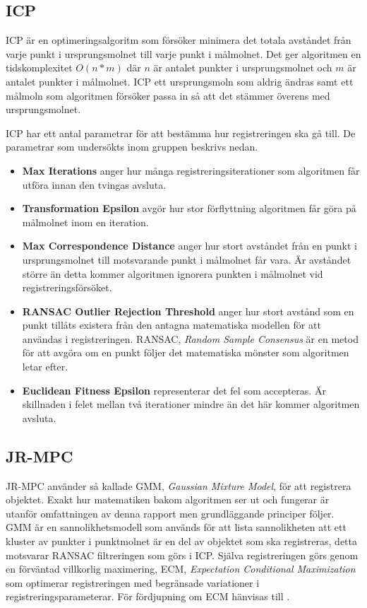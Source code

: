 \subsection{ICP}
ICP är en optimeringsalgoritm som försöker minimera det totala avståndet från varje punkt i ursprungsmolnet till varje punkt i målmolnet. Det ger algoritmen en tidskomplexitet $ \mathit{O(n*m)} $ där $ \mathit{n} $ är antalet punkter i ursprungsmolnet och $ \mathit{m} $ är antalet punkter i målmolnet. ICP ett ursprungsmoln som aldrig ändras samt ett målmoln som algoritmen försöker passa in så att det stämmer överens med ursprungsmolnet. 

ICP har ett antal parametrar för att bestämma hur registreringen ska gå till. De parametrar som undersökts inom gruppen beskrivs nedan.
\begin{itemize}
	\item \textbf{Max Iterations} anger hur många registrerings\-iterationer som algoritmen får utföra innan den tvingas avsluta.
	\item \textbf{Transformation Epsilon} avgör hur stor förflyttning algoritmen får göra på målmolnet inom en iteration.
	\item \textbf{Max Correspondence Distance} anger hur stort avståndet från en punkt i ursprungsmolnet till motsvarande punkt i målmolnet får vara. Är avståndet större än detta kommer algoritmen ignorera punkten i målmolnet vid registreringsförsöket.
	\item \textbf{RANSAC Outlier Rejection Threshold} anger hur stort avstånd som en punkt tillåts existera från den antagna matematiska modellen för att användas i registreringen. RANSAC, \textit{Random Sample Consensus} är en metod för att avgöra om en punkt följer det matematiska mönster som algoritmen letar efter.
	\item \textbf{Euclidean Fitness Epsilon} representerar det fel som accepteras. Är skillnaden i felet mellan två iterationer mindre än det här kommer algoritmen avsluta.
\end{itemize}

\subsection{JR-MPC}
JR-MPC använder så kallade GMM, \textit{Gaussian Mixture Model}, för att registrera objektet. Exakt hur matematiken bakom algoritmen ser ut och fungerar är utanför omfattningen av denna rapport men grundläggande principer följer. GMM är en sannolikhetsmodell som används för att lista sannolikheten att ett kluster av punkter i punktmolnet är en del av objektet som ska registreras, detta motsvarar RANSAC filtreringen som görs i ICP. Själva registreringen görs genom en förväntad villkorlig maximering, ECM, \textit{Expectation Conditional Maximization} som optimerar registreringen med begränsade variationer i registreringsparameterar. För fördjupning om ECM hänvisas till \cite{roche2011algorithm}.

